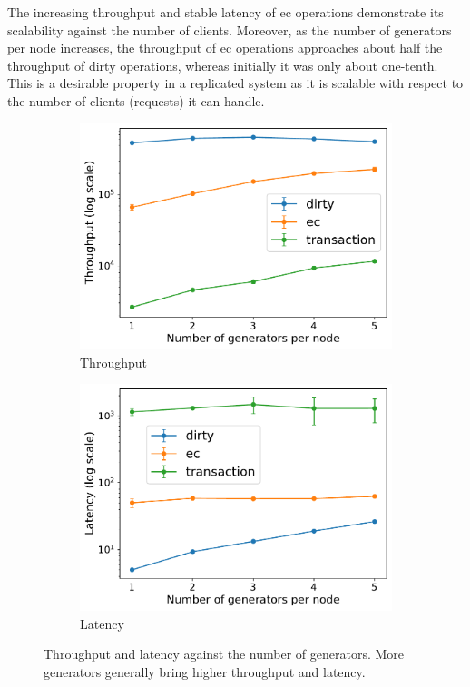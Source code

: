 The increasing throughput and stable latency of \acrshort{ec} operations demonstrate
its scalability against the number of clients. Moreover, as the number of
generators per node increases, the throughput of \acrshort{ec} operations
approaches about half the throughput of dirty operations, whereas initially it was
only about one-tenth. This is a desirable property in a replicated system as
it is scalable with respect to the number of clients (requests) it can handle.

\begin{figure}[htp]
  \centering
  \begin{subfigure}[t]{0.49\columnwidth}
    \centering
    \includegraphics[width=\columnwidth]{figures/tp_generators_caelum.pdf}
    \caption{Throughput}
    \label{fig:tp generators caelum}
  \end{subfigure}
  \begin{subfigure}[t]{0.49\columnwidth}
    \centering
    \includegraphics[width=\columnwidth]{figures/lat_generators_caelum.pdf}
    \caption{Latency}
    \label{fig:lat generators caelum}
  \end{subfigure}
  \caption{Throughput and latency against the number of generators. More generators
  generally bring higher throughput and latency.}
  \label{fig:generators caelum}
\end{figure}


